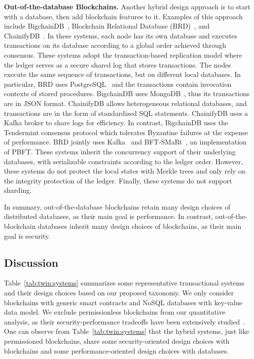 \textbf{Out-of-the-database Blockchains.} Another hybrid design approach is to
start with a database, then add blockchain features to it. Examples of this
approach include BigchainDB~\cite{mcconaghy2016bigchaindb}, Blockchain
Relational Database (BRD)~\cite{BlockchainMeetsDatabase}, and
ChainifyDB~\cite{schuhknecht2019chainifydb}. In these systems, each node has its
own database and executes transactions on its database according to a global
order achieved through consensus.
These systems adopt the transaction-based replication model where the
ledger serves as a secure shared log that stores transactions.
The nodes execute the same sequence of transactions, but on different local
databases.
In particular, BRD uses PostgreSQL~\cite{postgres} and the transactions contain
invocation contexts of stored procedures. BigchainDB uses
MongoDB~\cite{web:mongodb}, thus its transactions are in JSON format.
ChainifyDB allows heterogeneous relational databases, and transactions are in
the form of standardized SQL statements.
ChainifyDB uses a Kafka broker to share logs for efficiency. In contrast,
BigchainDB uses the Tendermint consensus protocol which tolerates Byzantine
failures at the expense of performance.
BRD jointly uses Kafka~\cite{web:kafka} and BFT-SMaRt~\cite{bftsmart}, an
implementation of PBFT.
These systems inherit the concurrency support of their underlying databases,
with serializable constraints according to the ledger order. However, these
systems do not protect the local states with Merkle trees and only rely on the
integrity protection of the ledger.
Finally, these systems do not support sharding.

In summary, out-of-the-database blockchains retain many design choices of
distributed databases, as their main goal is performance. In contrast,
out-of-the-blockchain databases inherit many design choices of blockchains, as
their main goal is security.

\subsection{Discussion}

Table~\ref{tab:twin:systems} summarizes some representative transactional systems and
their design choices based on our proposed taxonomy.
We only consider blockchains with generic smart contracts and NoSQL databases
with key-value data model.
We exclude permissionless blockchains from our quantitative analysis, as their
security-performance tradeoffs have been extensively
studied~\cite{gervais2016security}.
One can observe from Table~\ref{tab:twin:systems} that the hybrid systems, just like
permissioned blockchains, share some security-oriented design choices with
blockchains and some performance-oriented design choices with databases.

